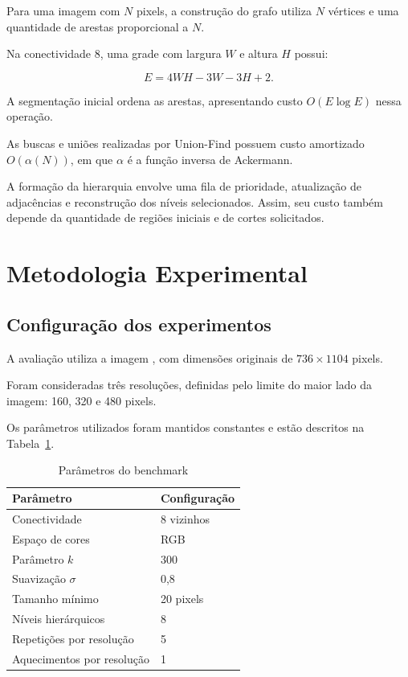\documentclass[12pt]{article}
\begin{document}
Para uma imagem com $N$ pixels, a construção
do grafo utiliza $N$ vértices e uma quantidade
de arestas proporcional a $N$.

Na conectividade 8, uma grade com largura
$W$ e altura $H$ possui:

\begin{equation}
E=4WH-3W-3H+2.
\end{equation}

A segmentação inicial ordena as arestas,
apresentando custo $O(E\log E)$ nessa operação.

As buscas e uniões realizadas por Union-Find
possuem custo amortizado $O(\alpha(N))$,
em que $\alpha$ é a função inversa de Ackermann.

A formação da hierarquia envolve uma fila de
prioridade, atualização de adjacências e
reconstrução dos níveis selecionados.
Assim, seu custo também depende da quantidade
de regiões iniciais e de cortes solicitados.

\section{Metodologia Experimental}
\label{sec:metodologia}

\subsection{Configuração dos experimentos}

A avaliação utiliza a imagem
, com dimensões
originais de $736\times1104$ pixels.

Foram consideradas três resoluções,
definidas pelo limite do maior lado
da imagem: 160, 320 e 480 pixels.

Os parâmetros utilizados foram mantidos
constantes e estão descritos
na Tabela~\ref{tab:parametros}.

\begin{table}[htbp]
\centering
\caption{Parâmetros do benchmark}
\label{tab:parametros}
\begin{tabular}{ll}
\toprule
Parâmetro & Configuração \\
\midrule
Conectividade & 8 vizinhos \\
Espaço de cores & RGB \\
Parâmetro $k$ & 300 \\
Suavização $\sigma$ & 0,8 \\
Tamanho mínimo & 20 pixels \\
Níveis hierárquicos & 8 \\
Repetições por resolução & 5 \\
Aquecimentos por resolução & 1 \\
\bottomrule
\end{tabular}
\end{table}
\end{document}
